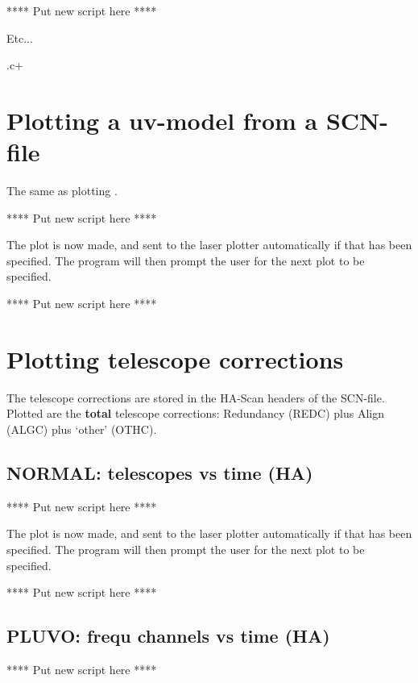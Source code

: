 **** Put new script here **** 


Etc... 

.c+ 
\section{Plotting a uv-model from a SCN-file} 
\label{.model} 

The same as plotting . 

**** Put new script here **** 

The plot is now made, and sent to the laser plotter automatically if that has
been specified. The program will then prompt the user for the next plot  to be
specified. 

**** Put new script here **** 


\section{Plotting telescope corrections} 
\label{.tel} 

The telescope corrections are stored in the HA-Scan headers of the SCN-file.
Plotted are the {\bf total} telescope corrections: Redundancy (REDC) plus Align
(ALGC) plus `other' (OTHC). 


\subsection{NORMAL: telescopes vs time (HA)} 
\label{.tel.normal} 

**** Put new script here **** 

The plot is now made, and sent to the laser plotter automatically if that has
been specified. The program will then prompt the user for the next plot  to be
specified. 

**** Put new script here **** 


\subsection{PLUVO: frequ channels vs time (HA)} 
\label{.tel.pluvo} 


**** Put new script here **** 

